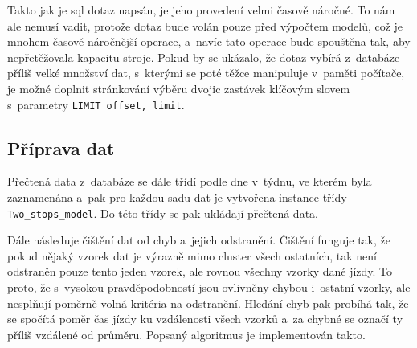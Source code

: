 \bigbreak


Takto jak je \gls{sql} dotaz napsán, je jeho provedení velmi časově náročné. To nám ale nemusí vadit, protože dotaz bude volán pouze před výpočtem modelů, což je mnohem časově náročnější operace, a~navíc tato operace bude spouštěna tak, aby nepřetěžovala kapacitu stroje. Pokud by se ukázalo, že dotaz vybírá z~databáze příliš velké množství dat, s~kterými se poté těžce manipuluje v~paměti počítače, je možné doplnit stránkování výběru dvojic zastávek klíčovým slovem s~parametry \texttt{LIMIT offset, limit}.


\subsection{Příprava dat}

Přečtená data z~databáze se dále třídí podle dne v~týdnu, ve kterém byla zaznamenána a~pak pro každou sadu dat je vytvořena instance třídy \texttt{Two\_stops\allowbreak\_model}. Do této třídy se pak ukládají přečtená data.


\bigbreak

Dále následuje čištění dat od chyb a~jejich odstranění. Čištění funguje tak, že pokud nějaký vzorek dat je výrazně mimo cluster všech ostatních, tak není odstraněn pouze tento jeden vzorek, ale rovnou všechny vzorky dané jízdy. To proto, že s~vysokou pravděpodobností jsou ovlivněny chybou i~ostatní vzorky, ale nesplňují poměrně volná kritéria na odstranění. Hledání chyb pak probíhá tak, že se spočítá poměr čas jízdy ku vzdálenosti všech vzorků a~za chybné se označí ty příliš vzdálené od průměru. Popsaný algoritmus je implementován takto.


